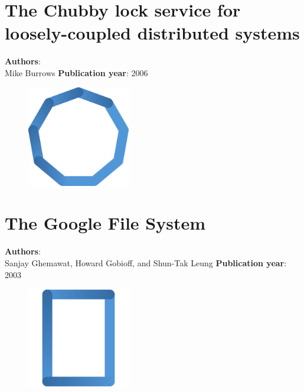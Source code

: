 \documentclass[11pt,fleqn]{book} %
\begin{document}
\chapter{The Chubby lock service for loosely-coupled distributed systems}
\vspace*{-7mm}
\Large \textbf{Authors}: \\
Mike Burrows
\newline\newline
\textbf{Publication year}: 2006
\begin{figure}[b]
    \centering
    \includegraphics[width=0.4\textwidth]{distributed-systems-blue.pdf}
\end{figure}


\chapter{The Google File System}
\vspace*{-7mm}
\Large \textbf{Authors}: \\
Sanjay Ghemawat, Howard Gobioff, and Shun-Tak Leung
\newline\newline
\textbf{Publication year}: 2003
\begin{figure}[b]
    \centering
    \includegraphics[width=0.4\textwidth]{distributed-systems-rectangle-blue.pdf}
\end{figure}

\end{document}
